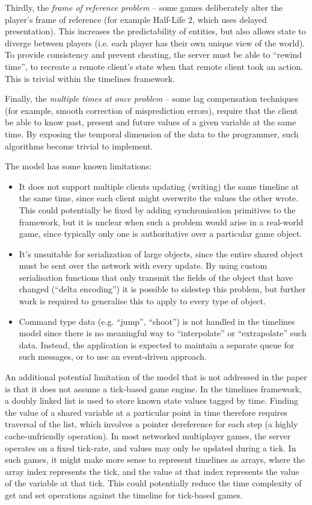 \documentclass[conference]{IEEEtran}
\begin{document}
	Thirdly, the \emph{frame of reference problem} -- some games deliberately alter the player's frame of reference (for example Half-Life 2, which uses delayed presentation). This increases the predictability of entities, but also allows state to diverge between players (i.e. each player has their own unique view of the world). To provide consistency and prevent cheating, the server must be able to ``rewind time'', to recreate a remote client's state when that remote client took an action. This is trivial within the timelines framework.

	Finally, the \emph{multiple times at once problem} -- some lag compensation techniques (for example, smooth correction of misprediction errors), require that the client be able to know past, present and future values of a given variable at the same time. By exposing the temporal dimension of the data to the programmer, such algorithms become trivial to implement.

	The model has some known limitations:

	\begin{itemize}
		\item It does not support multiple clients updating (writing) the same timeline at the same time, since each client might overwrite the values the other wrote. This could potentially be fixed by adding synchronisation primitives to the framework, but it is unclear when such a problem would arise in a real-world game, since typically only one is authoritative over a particular game object.
		\item It's unsuitable for serialization of large objects, since the entire shared object must be sent over the network with every update. By using custom serialisation functions that only transmit the fields of the object that have changed (``delta encoding'') it is possible to sidestep this problem, but further work is required to generalise this to apply to every type of object.
		\item Command type data (e.g. ``jump'', ``shoot'') is not handled in the timelines model since there is no meaningful way to ``interpolate'' or ``extrapolate'' such data. Instead, the application is expected to maintain a separate queue for such messages, or to use an event-driven approach.
	\end{itemize}

	An additional potential limitation of the model that is not addressed in the paper is that it does not assume a tick-based game engine. In the timelines framework, a doubly linked list is used to store known state values tagged by time. Finding the value of a shared variable at a particular point in time therefore requires traversal of the list, which involves a pointer dereference for each step (a highly cache-unfriendly operation). In most networked multiplayer games, the server operates on a fixed tick-rate, and values may only be updated during a tick. In such games, it might make more sense to represent timelines as arrays, where the array index represents the tick, and the value at that index represents the value of the variable at that tick. This could potentially reduce the time complexity of get and set operations against the timeline for tick-based games.
\end{document}
